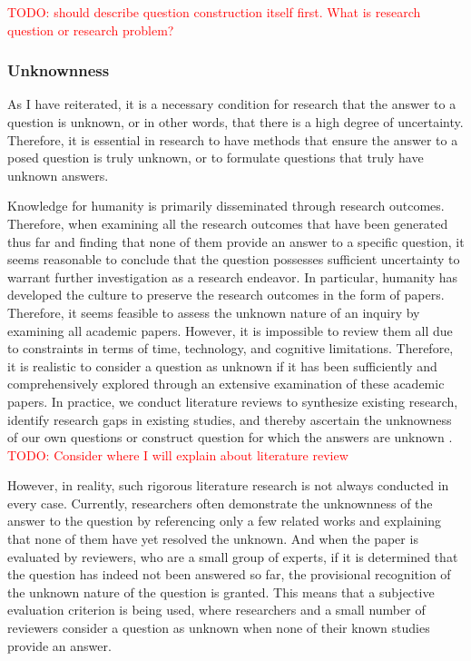 \documentclass{book}
\begin{document}
\textcolor{red}{TODO: should describe question construction itself first. What is research question or research problem?}

\subsubsection{Unknownness}
As I have reiterated, it is a necessary condition for research that the answer to a question is unknown, or in other words, that there is a high degree of uncertainty. Therefore, it is essential in research to have methods that ensure the answer to a posed question is truly unknown, or to formulate questions that truly have unknown answers.

Knowledge for humanity is primarily disseminated through research outcomes. Therefore, when examining all the research outcomes that have been generated thus far and finding that none of them provide an answer to a specific question, it seems reasonable to conclude that the question possesses sufficient uncertainty to warrant further investigation as a research endeavor. In particular, humanity has developed the culture to preserve the research outcomes in the form of papers. Therefore, it seems feasible to assess the unknown nature of an inquiry by examining all academic papers. However, it is impossible to review them all due to constraints in terms of time, technology, and cognitive limitations. Therefore, it is realistic to consider a question as unknown if it has been sufficiently and comprehensively explored through an extensive examination of these academic papers. In practice, we conduct literature reviews to synthesize existing research, identify research gaps in existing studies, and thereby ascertain the unknowness of our own questions or construct question for which the answers are unknown \cite{schryen2015theory}. \textcolor{red}{TODO: Consider where I will explain about literature review}


However, in reality, such rigorous literature research is not always conducted in every case. Currently, researchers often demonstrate the unknownness of the answer to the question by referencing only a few related works and explaining that none of them have yet resolved the unknown. And when the paper is evaluated by reviewers, who are a small group of experts, if it is determined that the question has indeed not been answered so far, the provisional recognition of the unknown nature of the question is granted. This means that a subjective evaluation criterion is being used, where researchers and a small number of reviewers consider a question as unknown when none of their known studies provide an answer.
\end{document}
